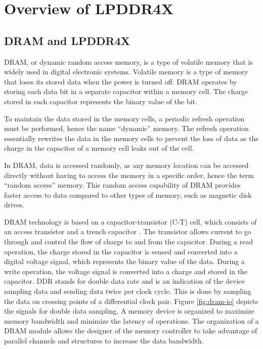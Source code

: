 \chapter{Overview of LPDDR4X}

\section{DRAM and LPDDR4X}
DRAM, or dynamic random access memory, is a type of volatile memory that is widely used in digital electronic systems. Volatile memory is a type of memory that loses its stored data when the power is turned off. DRAM operates by storing each data bit in a separate capacitor within a memory cell. The charge stored in each capacitor represents the binary value of the bit.

To maintain the data stored in the memory cells, a periodic refresh operation must be performed, hence the name “dynamic” memory. The refresh operation essentially rewrites the data in the memory cells to prevent the loss of data as the charge in the capacitor of a memory cell leaks out of the cell.

In DRAM, data is accessed randomly, as any memory location can be accessed directly without having to access the memory in a specific order, hence the term “random access” memory. This random access capability of DRAM provides faster access to data compared to other types of memory, such as magnetic disk drives.

DRAM technology is based on a capacitor-transistor (C-T) cell, which consists of an access transistor and a trench capacitor \cite{BORA}. The transistor allows current to go through and control the flow of charge to and from the capacitor. During a read operation, the charge stored in the capacitor is sensed and converted into a digital voltage signal, which represents the binary value of the data. During a write operation, the voltage signal is converted into a charge and stored in the capacitor.
DDR stands for double data rate and is an indication of the device sampling data and sending data twice per clock cycle. This is done by sampling the data on crossing points of a differential clock pair. Figure \ref{fig:dram-io} depicts the signals for double data sampling. 
A memory device is organized to maximize memory bandwidth and minimize the latency of operations. The organization of a DRAM module allows the designer of the memory controller to take advantage of parallel channels and structures to increase the data bandwidth. 

